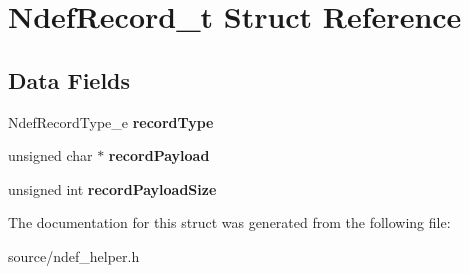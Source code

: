\hypertarget{struct_ndef_record__t}{}\section{Ndef\+Record\+\_\+t Struct Reference}
\label{struct_ndef_record__t}
\subsection*{Data Fields}
\begin{DoxyCompactItemize}
\item 
\mbox{\label{struct_ndef_record__t_a477e4c8ad1da29b98d2c168632dcce1d}} 
Ndef\+Record\+Type\+\_\+e {\bfseries record\+Type}
\item 
\mbox{\label{struct_ndef_record__t_a7b6cc2dcbed326e10081c57e9375f674}} 
unsigned char $\ast$ {\bfseries record\+Payload}
\item 
\mbox{\label{struct_ndef_record__t_acd192c9a49f450730f1b74cae9fc8eef}} 
unsigned int {\bfseries record\+Payload\+Size}
\end{DoxyCompactItemize}


The documentation for this struct was generated from the following file\+:\begin{DoxyCompactItemize}
\item 
source/ndef\+\_\+helper.\+h\end{DoxyCompactItemize}
